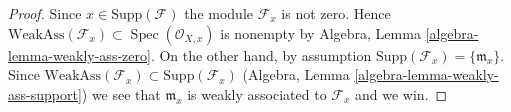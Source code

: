\documentclass[10pt,a4paper]{amsart}
\theoremstyle{plain}
\theoremstyle{definition}
\theoremstyle{remark}
\numberwithin{equation}{subsection}
\def\Spec{\mathop{\mathrm{Spec}}}
\begin{document}
\begin{proof}
Since $x \in \text{Supp}(\mathcal{F})$ the module $\mathcal{F}_x$
is not zero. Hence
$\text{WeakAss}(\mathcal{F}_x) \subset \Spec(\mathcal{O}_{X, x})$
is nonempty by
Algebra, Lemma \ref{algebra-lemma-weakly-ass-zero}.
On the other hand, by assumption
$\text{Supp}(\mathcal{F}_x) = \{\mathfrak m_x\}$.
Since
$\text{WeakAss}(\mathcal{F}_x) \subset \text{Supp}(\mathcal{F}_x)$
(Algebra, Lemma \ref{algebra-lemma-weakly-ass-support})
we see that $\mathfrak m_x$ is weakly associated to $\mathcal{F}_x$
and we win.
\end{proof}
\end{document}
